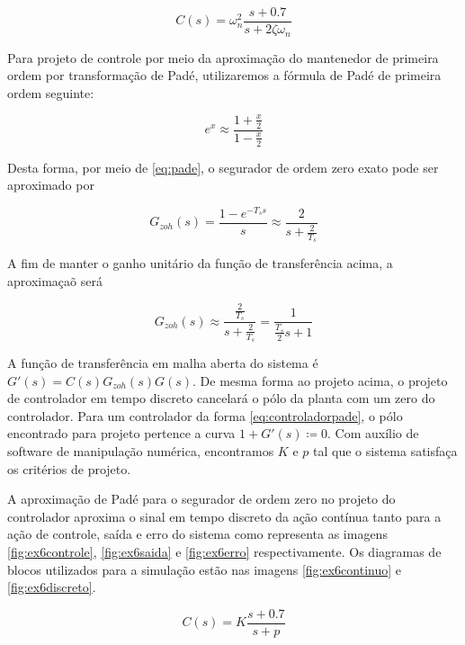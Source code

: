        \begin{equation}
            C(s) = \omega_n^2 \frac{s + 0.7}{s + 2 \zeta \omega_n}
        \end{equation}
        
    Para projeto de controle por meio da aproximação do mantenedor de primeira ordem por transformação de Padé, utilizaremos a fórmula de Padé de primeira ordem seguinte:
    
        \begin{equation}
        e^{x} \approx \frac{1 + \frac{x}{2}}{1 - \frac{x}{2}}
        \label{eq:pade}
        \end{equation}
    
    Desta forma, por meio de \eqref{eq:pade}, o segurador de ordem zero exato pode ser aproximado por
    
        \begin{equation}
        G_{zoh}(s) = \frac{1 - e^{-T_s s}}{s} \approx \frac{2}{ s + \frac{2}{T_s}}
        \end{equation}
    
    A fim de manter o ganho unitário da função de transferência acima, a aproximaçaõ será 
    
        \begin{equation}
        G_{zoh}(s) \approx \frac{\frac{2}{T_s}}{s + \frac{2}{T_s}} = \frac{1}{\frac{T_s}{2} s + 1} 
        \end{equation}
    
    A função de transferência em malha aberta do sistema é $G'(s) = C(s)G_{zoh}(s)G(s)$. De mesma forma ao projeto acima, o projeto de controlador em tempo discreto cancelará o pólo da planta com um zero do controlador. Para um controlador da forma \eqref{eq:controladorpade}, o pólo encontrado para projeto pertence a curva $1 + G'(s) \coloneqq 0$.   Com auxílio de software de manipulação numérica, encontramos $K$ e $p$ tal que o sistema satisfaça os critérios de  projeto. 
    
    A aproximação de Padé para o segurador de ordem zero no projeto do controlador aproxima o sinal em tempo discreto da ação contínua tanto para a ação de controle, saída e erro do sistema como representa as imagens \ref{fig:ex6controle}, \ref{fig:ex6saida} e \ref{fig:ex6erro}  respectivamente. Os diagramas de blocos utilizados para a simulação estão nas imagens \ref{fig:ex6continuo} e \ref{fig:ex6discreto}.
    
    \begin{equation}
    \label{eq:controladorpade}
        C(s) = K \frac{s + 0.7}{s + p}
    \end{equation}
    

